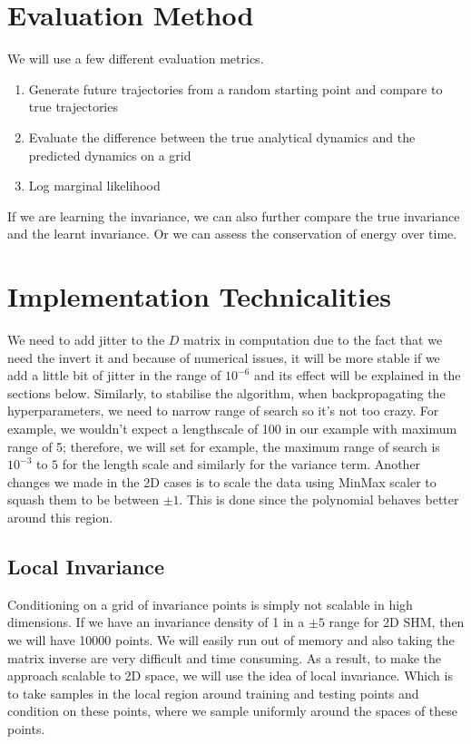 \documentclass{statsmsc}
\begin{document}
\section{Evaluation Method}
We will use a few different evaluation metrics. 
\begin{enumerate}
    \item Generate future trajectories from a random starting point and compare to true trajectories
    \item Evaluate the difference between the true analytical dynamics and the predicted dynamics on a grid
    \item Log marginal likelihood
\end{enumerate}
If we are learning the invariance, we can also further compare the true invariance and the learnt invariance.
Or we can assess the conservation of energy over time.

\section{Implementation Technicalities}
We need to add jitter to the $D$ matrix in computation due to the fact that we need the invert it and because of numerical issues, it will be more stable if we add a little bit of jitter in the range of $10^{-6}$ and its effect will be explained in the sections below.
Similarly, to stabilise the algorithm, when backpropagating the hyperparameters, we need to narrow range of search so it's not too crazy. 
For example, we wouldn't expect a lengthscale of 100 in our example with maximum range of 5; therefore, we will set for example, the maximum range of search is $10^{-3}$ to $5$ for the length scale and similarly for the variance term.
Another changes we made in the 2D cases is to scale the data using MinMax scaler to squash them to be between $\pm 1$. 
This is done since the polynomial behaves better around this region.

\subsection*{Local Invariance}
Conditioning on a grid of invariance points is simply not scalable in high dimensions. 
If we have an invariance density of 1 in a $\pm 5$ range for 2D SHM, then we will have 10000 points. 
We will easily run out of memory and also taking the matrix inverse are very difficult and time consuming.
As a result, to make the approach scalable to 2D space, we will use the idea of local invariance. 
Which is to take samples in the local region around training and testing points and condition on these points, where we sample uniformly around the spaces of these points.
\end{document}
